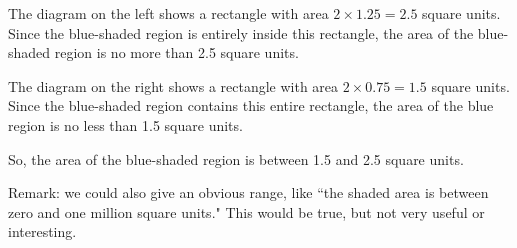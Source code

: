 \begin{solution}
\begin{center}
\qquad
{}
\end{center}
The diagram on the left shows a rectangle with area $2 \times 1.25=2.5$ square  units. Since the blue-shaded region is entirely inside this rectangle, the area of the blue-shaded region is no more than 2.5 square units.

The diagram on the right shows a rectangle with area $2 \times 0.75=1.5$ square  units. Since the blue-shaded region contains this entire rectangle, the area of the blue region is no less than 1.5 square units.

So, the area of the blue-shaded region is between 1.5 and 2.5 square units.

Remark: we could also give an obvious range, like ``the shaded area is between zero and one million square units." This would be true, but not very useful or interesting.
\end{solution}


